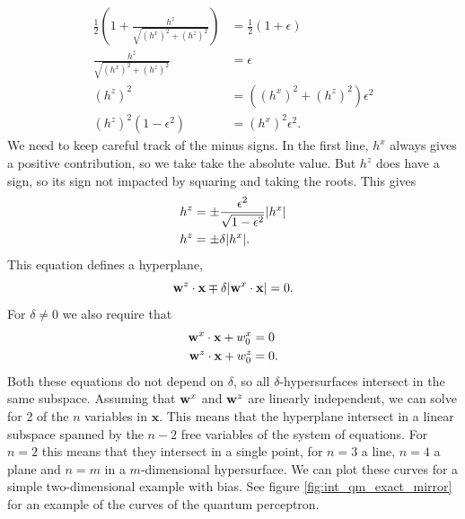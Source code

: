 \begin{align*}
    \frac{1}{2}\left(1+\frac{h^z}{\sqrt{(h^x)^2+(h^z)^2}}\right) &= \frac{1}{2}(1 + \epsilon)\\
    \frac{h^z}{\sqrt{(h^x)^2+(h^z)^2}} &= \epsilon\\
    (h^z)^2 &= ((h^x)^2+(h^z)^2) \epsilon^2\\
    (h^z)^2(1-\epsilon^2) &= (h^x)^2 \epsilon^2.
\end{align*}
We need to keep careful track of the minus signs. In the first line, $h^x$ always gives a positive contribution, so we take take the absolute value. But $h^z$ does have a sign, so its sign not impacted by squaring and taking the roots. This gives
\begin{align*}
    h^z &=  \pm \frac{ \epsilon^2}{\sqrt{1- \epsilon^2}} \abs{h^x} \\
    h^z &= \pm\delta \abs{h^x}.
\end{align*}
This equation defines a hyperplane,
\begin{equation*}
    \mathbf{w}^{z}\cdot \mathbf{x} \mp \delta\abs{\mathbf{w}^{x} \cdot\mathbf{x}}= 0.
\end{equation*}
For $\delta\neq0$ we also require that
\begin{align*}
    \mathbf{w}^{x}\cdot \mathbf{x} + w_0^x &= 0\\
    \mathbf{w}^{z}\cdot \mathbf{x} + w_0^z &= 0.
\end{align*}
Both these equations do not depend on $\delta$, so all $\delta$-hypersurfaces intersect in the same subspace. Assuming that $\mathbf{w}^{x}$ and $\mathbf{w}^{z}$ are linearly independent, we can solve for 2 of the $n$ variables in $\mathbf{x}$. This means that the hyperplane intersect in a linear subspace spanned by the $n-2$ free variables of the system of equations. For $n=2$ this means that they intersect in a single point, for $n=3$ a line, $n=4$ a plane and $n=m$ in a $m$-dimensional hypersurface. We can plot these curves for a simple two-dimensional example with bias. See figure \ref{fig:int_qm_exact_mirror} for an example of the curves of the quantum perceptron.
